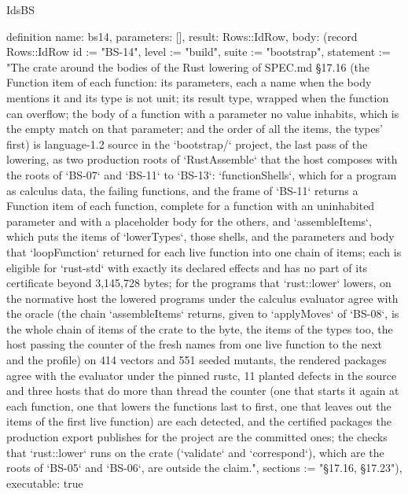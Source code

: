 \begin{lexlean}{IdsBS}
\begin{semanticmodule}
definition{
  name: bs14,
  parameters: [],
  result: Rows::IdRow,
  body: (record Rows::IdRow {id := "BS-14", level := "build", suite := "bootstrap", statement := "The crate around the bodies of the Rust lowering of SPEC.md §17.16 (the Function item of each function: its parameters, each a name when the body mentions it and its type is not unit; its result type, wrapped when the function can overflow; the body of a function with a parameter no value inhabits, which is the empty match on that parameter; and the order of all the items, the types' first) is language-1.2 source in the `bootstrap/` project, the last pass of the lowering, as two production roots of `RustAssemble` that the host composes with the roots of `BS-07` and `BS-11` to `BS-13`: `functionShells`, which for a program as calculus data, the failing functions, and the frame of `BS-11` returns a Function item of each function, complete for a function with an uninhabited parameter and with a placeholder body for the others, and `assembleItems`, which puts the items of `lowerTypes`, those shells, and the parameters and body that `loopFunction` returned for each live function into one chain of items; each is eligible for `rust-std` with exactly its declared effects and has no part of its certificate beyond 3,145,728 bytes; for the programs that `rust::lower` lowers, on the normative host the lowered programs under the calculus evaluator agree with the oracle (the chain `assembleItems` returns, given to `applyMoves` of `BS-08`, is the whole chain of items of the crate to the byte, the items of the types too, the host passing the counter of the fresh names from one live function to the next and the profile) on 414 vectors and 551 seeded mutants, the rendered packages agree with the evaluator under the pinned rustc, 11 planted defects in the source and three hosts that do more than thread the counter (one that starts it again at each function, one that lowers the functions last to first, one that leaves out the items of the first live function) are each detected, and the certified packages the production export publishes for the project are the committed ones; the checks that `rust::lower` runs on the crate (`validate` and `correspond`), which are the roots of `BS-05` and `BS-06`, are outside the claim.", sections := "§17.16, §17.23"}),
  executable: true
}


\end{semanticmodule}
\end{lexlean}
